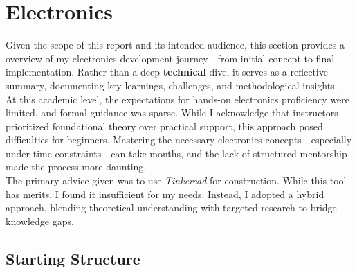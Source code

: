 \documentclass{article}
\begin{document}
\newpage{}
\section{Electronics}
Given the scope of this report and its intended audience, this section provides a overview of my electronics development journey---from initial concept to final implementation. Rather than a deep \textbf{technical} dive, it serves as a reflective summary, documenting key learnings, challenges, and methodological insights.\\[8pt]
At this academic level, the expectations for hands-on electronics proficiency were limited, and formal guidance was sparse. While I acknowledge that instructors prioritized foundational theory over practical support, this approach posed difficulties for beginners. Mastering the necessary electronics concepts---especially under time constraints---can take months, and the lack of structured mentorship made the process more daunting.\\[8pt]
The primary advice given was to use \textit{Tinkercad} for construction. While this tool has merits, I found it insufficient for my needs. Instead, I adopted a hybrid approach, blending theoretical understanding with targeted research to bridge knowledge gaps.
\vspace{-0.4em}
\subsection{Starting Structure}
\end{document}
